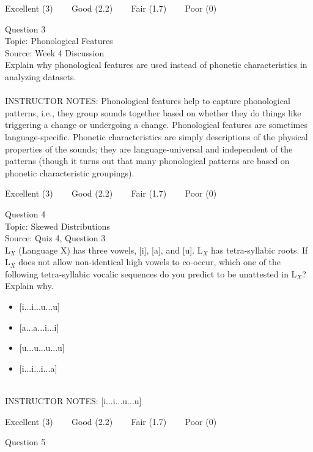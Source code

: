 \documentclass[12pt]{article}
\begin{document}
\vfill
Excellent (3) ~~~ Good (2.2) ~~~ Fair (1.7) ~~~ Poor (0)
\newpage

{\large Question 3}\\

Topic: Phonological Features\\
Source: Week 4 Discussion\\

Explain why phonological features are used instead of phonetic characteristics in analyzing datasets.\\


~\\
INSTRUCTOR NOTES: Phonological features help to capture phonological patterns, i.e., they group sounds together based on whether they do things like triggering a change or undergoing a change. Phonological features are sometimes language-specific. Phonetic characteristics are simply descriptions of the physical properties of the sounds; they are language-universal and independent of the patterns (though it turns out that many phonological patterns are based on phonetic characteristic groupings).


\vfill
Excellent (3) ~~~ Good (2.2) ~~~ Fair (1.7) ~~~ Poor (0)
\newpage

{\large Question 4}\\

Topic: Skewed Distributions\\
Source: Quiz 4, Question 3\\

L$_X$ (Language X) has three vowels, [i], [a], and [u]. L$_X$ has tetra-syllabic roots. If L$_X$ does not allow non-identical high vowels to co-occur, which one of the following tetra-syllabic vocalic sequences do you predict to be unattested in L$_X$? Explain why.\\

\begin{itemize} \item {[i...i...u...u]} \item {[a...a...i...i]} \item {[u...u...u...u]} \item {[i...i...i...a]} \end{itemize}


~\\
INSTRUCTOR NOTES: [i...i...u...u]


\vfill
Excellent (3) ~~~ Good (2.2) ~~~ Fair (1.7) ~~~ Poor (0)
\newpage

{\large Question 5}\\
\end{document}
